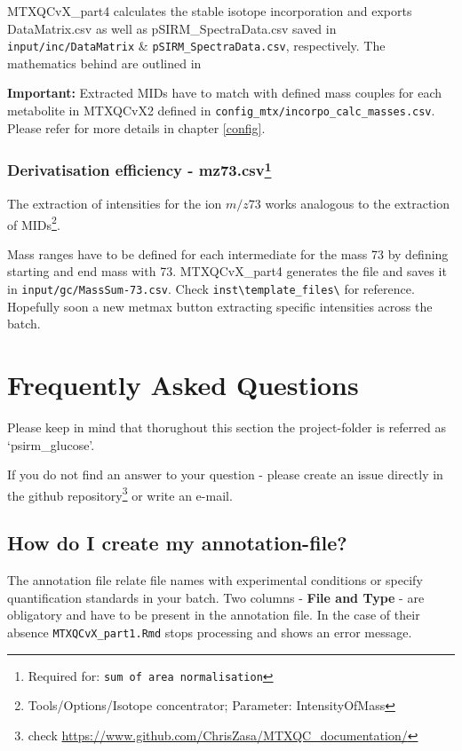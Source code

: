 \documentclass[]{book}
\let\rmarkdownfootnote\footnote%
\def\footnote{\protect\rmarkdownfootnote}
\theoremstyle{definition}
\theoremstyle{definition}
\theoremstyle{definition}
\theoremstyle{remark}
\begin{document}
MTXQCvX\_part4 calculates the stable isotope incorporation and exports
DataMatrix.csv as well as pSIRM\_SpectraData.csv saved in
\texttt{input/inc/DataMatrix} \& \texttt{pSIRM\_SpectraData.csv},
respectively. The mathematics behind are outlined in \citep{Pietzke2014}

\textbf{Important:} Extracted MIDs have to match with defined mass
couples for each metabolite in MTXQCvX2 defined in
\texttt{config\_mtx/incorpo\_calc\_masses.csv}. Please refer for more
details in chapter \ref{config}.

\subsection[Derivatisation efficiency -
mz73.csv]{\texorpdfstring{Derivatisation efficiency - mz73.csv\footnote{Required
  for: \texttt{sum\ of\ area\ normalisation}}}{Derivatisation efficiency - mz73.csv}}\label{derivatisation-efficiency---mz73.csv}

The extraction of intensities for the ion \(m/z 73\) works analogous to
the extraction of MIDs\footnote{Tools/Options/Isotope concentrator;
  Parameter: IntensityOfMass}.

Mass ranges have to be defined for each intermediate for the mass 73 by
defining starting and end mass with 73. MTXQCvX\_part4 generates the
file and saves it in \texttt{input/gc/MassSum-73.csv}. Check
\texttt{inst\textbackslash{}template\_files\textbackslash{}} for
reference. Hopefully soon a new metmax button extracting specific
intensities across the batch.

\chapter{Frequently Asked Questions}\label{FAQ}

Please keep in mind that thorughout this section the project-folder is
referred as `psirm\_glucose'.

If you do not find an answer to your question - please create an issue
directly in the github repository\footnote{check
  \url{https://www.github.com/ChrisZasa/MTXQC_documentation/}} or write
an e-mail.

\section{How do I create my annotation-file?}\label{createannotation}

The annotation file relate file names with experimental conditions or
specify quantification standards in your batch. Two columns -
\textbf{File and Type} - are obligatory and have to be present in the
annotation file. In the case of their absence
\texttt{MTXQCvX\_part1.Rmd} stops processing and shows an error message.
\end{document}
